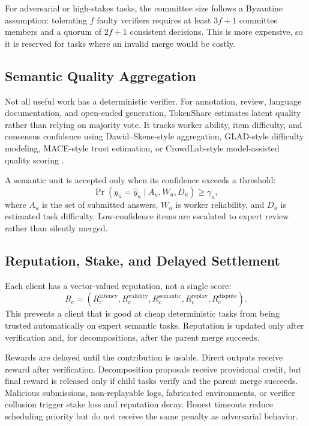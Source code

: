 \documentclass{article}
\theoremstyle{plain}
\begin{document}
For adversarial or high-stakes tasks, the committee size follows a Byzantine assumption: tolerating $f$ faulty verifiers requires at least $3f+1$ committee members and a quorum of $2f+1$ consistent decisions. This is more expensive, so it is reserved for tasks where an invalid merge would be costly.

\subsection{Semantic Quality Aggregation}

Not all useful work has a deterministic verifier. For annotation, review, language documentation, and open-ended generation, TokenShare estimates latent quality rather than relying on majority vote. It tracks worker ability, item difficulty, and consensus confidence using Dawid--Skene-style aggregation, GLAD-style difficulty modeling, MACE-style trust estimation, or CrowdLab-style model-assisted quality scoring \citep{dawid1979maximum,whitehill2009glad,hovy2013mace,goh2023crowdlab}.

A semantic unit is accepted only when its confidence exceeds a threshold:
\[
\Pr(y_u=\hat{y}_u \mid A_u,W_u,D_u) \geq \gamma_u,
\]
where $A_u$ is the set of submitted answers, $W_u$ is worker reliability, and $D_u$ is estimated task difficulty. Low-confidence items are escalated to expert review rather than silently merged.

\subsection{Reputation, Stake, and Delayed Settlement}

Each client has a vector-valued reputation, not a single score:
\[
R_c=(R_c^{\mathrm{latency}},R_c^{\mathrm{validity}},R_c^{\mathrm{semantic}},R_c^{\mathrm{replay}},R_c^{\mathrm{dispute}}).
\]
This prevents a client that is good at cheap deterministic tasks from being trusted automatically on expert semantic tasks. Reputation is updated only after verification and, for decompositions, after the parent merge succeeds.

Rewards are delayed until the contribution is usable. Direct outputs receive reward after verification. Decomposition proposals receive provisional credit, but final reward is released only if child tasks verify and the parent merge succeeds. Malicious submissions, non-replayable logs, fabricated environments, or verifier collusion trigger stake loss and reputation decay. Honest timeouts reduce scheduling priority but do not receive the same penalty as adversarial behavior.
\end{document}
